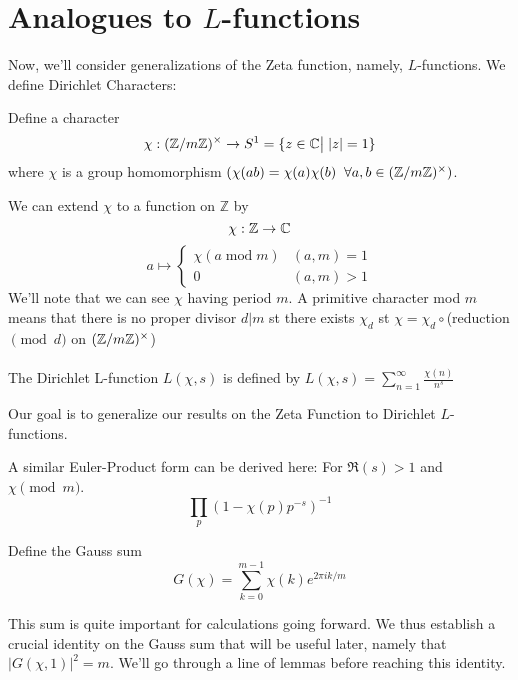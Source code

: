 \section{Analogues to $L$-functions}
Now, we'll consider generalizations of the Zeta function, namely, $L$-functions. We define
Dirichlet Characters:
\begin{definition}
    Define a character \[\chi: (\mathbb{Z}/m\mathbb{Z})^{\times}\rightarrow S^1 =\{z\in\mathbb{C} \big|\; |z|=1\}\]
where $\chi$ is a group homomorphism $(\chi(ab)=\chi(a)\chi(b)\;\; \forall a,b\in(\mathbb{Z}/m\mathbb{Z})^{\times})$.
\end{definition}
We can extend $\chi$ to a function on $\mathbb{Z}$ by 
\[
    \chi:\mathbb{Z} \rightarrow \mathbb{C}  
\]
\[
    a \mapsto 
    \begin{cases} 
        \chi (a \;\text{mod}\; m) & (a,m) = 1 \\
        0 & (a,m)>1
    \end{cases}
\]
We'll note that we can see $\chi$ having period $m$. A primitive character mod $m$ means
that there is no proper divisor $d|m$ st there exists $\chi_d$ st $\chi=\chi_d\circ $(reduction $\pmod d$
on $(\mathbb{Z}/m\mathbb{Z})^{\times}$)\\\\
The Dirichlet L-function $L(\chi,s)$ is defined by $L(\chi,s)=\sum_{n=1}^{\infty}\frac{\chi(n)}{n^s}$

Our goal is to generalize our results on the Zeta Function to Dirichlet $L$-functions.
\begin{remark}
A similar Euler-Product form can be derived here: For $\Re(s)>1$ and $\chi \pmod m$.
\[
    \prod_{p}(1-\chi(p)p^{-s})^{-1}  
\]
\end{remark}
\begin{definition}
    Define the Gauss sum 
    \[
        G(\chi)=\sum_{k=0}^{m-1}\chi(k)e^{2\pi ik/m}
    \]
\end{definition}
This sum is quite important for calculations going forward. We thus establish a crucial identity 
on the Gauss sum that will be useful later, namely that $|G(\chi,1)|^2=m$. We'll go through a line of lemmas
before reaching this identity.

